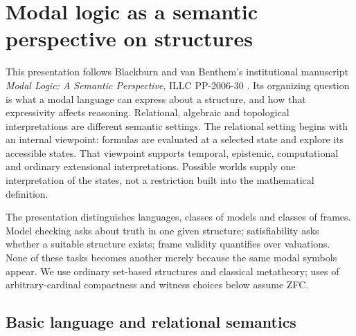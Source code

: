 \chapter{Modal logic as a semantic perspective on structures}
\label{sec:p08-src-025-501}

This presentation follows Blackburn and van Benthem's institutional manuscript
\emph{Modal Logic: A Semantic Perspective}, ILLC PP-2006-30
\cite{BlackburnVanBenthem2006ILLC}. Its organizing question is what a modal
language can express about a structure, and how that expressivity affects
reasoning. Relational, algebraic and topological interpretations are different
semantic settings. The relational setting begins with an internal viewpoint:
formulas are evaluated at a selected state and explore its accessible states.
That viewpoint supports temporal, epistemic, computational and ordinary
extensional interpretations. Possible worlds supply one interpretation of
the states, not a restriction built into the mathematical definition.

The presentation distinguishes languages, classes of models and classes of
frames. Model checking asks about truth in one given structure; satisfiability
asks whether a suitable structure exists; frame validity quantifies over
valuations. None of these tasks becomes another merely because the same
modal symbols appear. We use ordinary set-based structures and classical
metatheory; uses of arbitrary-cardinal compactness and witness choices below
assume ZFC.

\section{Basic language and relational semantics}
\label{sec:p08-bvb501-basic}

